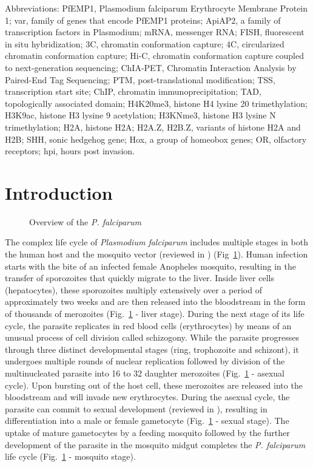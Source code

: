 Abbreviations: PfEMP1, Plasmodium falciparum Erythrocyte Membrane Protein 1;
var, family of genes that encode PfEMP1 proteins; ApiAP2, a family of
transcription factors in Plasmodium; mRNA, messenger RNA; FISH, fluorescent in
situ hybridization; 3C, chromatin conformation capture; 4C, circularized
chromatin conformation capture; Hi-C, chromatin conformation capture coupled
to next-generation sequencing; ChIA-PET, Chromatin Interaction Analysis by
Paired-End Tag Sequencing; PTM, post-translational modification; TSS,
transcription start site; ChIP, chromatin immunoprecipitation; TAD,
topologically associated domain; H4K20me3, histone H4 lysine 20
trimethylation; H3K9ac, histone H3 lysine 9 acetylation; H3K{N}me3, histone H3
lysine {N} trimethylation; H2A, histone H2A; H2A.Z, H2B.Z, variants of histone
H2A and H2B; SHH, sonic hedgehog gene; Hox, a group of homeobox genes; OR,
olfactory receptors; hpi, hours post invasion.


\section{Introduction}

\begin{figure}
\caption{Overview of the {\em P. falciparum}}
\label{fig:overview}
\end{figure}

The complex life cycle of \textit{Plasmodium falciparum} includes multiple stages in
both the human host and the mosquito vector (reviewed in
\citet{greenwood:malaria}) (Fig~\ref{fig:overview}). Human
infection starts with the bite of an infected female Anopheles mosquito,
resulting in the transfer of sporozoites that quickly migrate to the liver.
Inside liver cells (hepatocytes), these sporozoites multiply extensively over
a period of approximately two weeks and are then released into the bloodstream
in the form of thousands of merozoites (Fig.~\ref{fig:overview} - liver stage).
During the next
stage of its life cycle, the parasite replicates in red blood cells
(erythrocytes) by means of an unusual process of cell division called
schizogony. While the parasite progresses through three distinct developmental
stages (ring, trophozoite and schizont), it undergoes multiple rounds of
nuclear replication followed by division of the multinucleated parasite into
16 to 32 daughter merozoites (Fig.~\ref{fig:overview} - asexual cycle).
Upon bursting out of
the host cell, these merozoites are released into the bloodstream and will
invade new erythrocytes. During the asexual cycle, the parasite can commit to
sexual development (reviewed in \citet{baker:malaria}),
resulting in differentiation into a male
or female gametocyte (Fig.~\ref{fig:overview} - sexual stage). The uptake of mature gametocytes
by a feeding mosquito followed by the further development of the parasite in
the mosquito midgut completes the \textit{P. falciparum} life cycle
(Fig.~\ref{fig:overview} - mosquito
stage).

